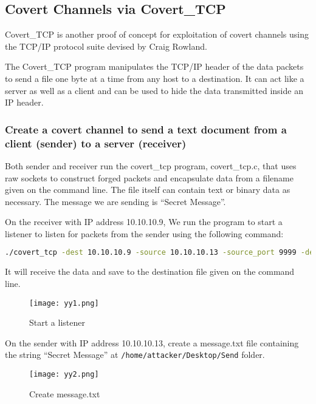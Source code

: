 \documentclass[letterpaper,twocolumn,10pt]{article}
\begin{document}
\subsection{Covert Channels via Covert\_TCP}

Covert\_TCP is another proof of concept for exploitation of covert channels using the TCP/IP protocol suite devised by Craig Rowland\cite{monday}. 

The Covert\_TCP program manipulates the TCP/IP header of the data packets to send a file one byte at a time from any host to a destination. It can act like a server as well as a client and can be used to hide the data transmitted inside an IP header.

\subsubsection{Create a covert channel to send a text document from a client (sender) to a server (receiver)}

Both sender and receiver run the covert\_tcp program, covert\_tcp.c, that uses raw sockets to construct forged packets and encapsulate data from a filename given on the command line. The file itself can contain text or binary data as necessary. The message we are sending is “Secret Message”.

On the receiver with IP address 10.10.10.9, We run the program to start a listener to listen for packets from the sender using the following command:

\begin{lstlisting}[language=bash, frame=none]
./covert_tcp -dest 10.10.10.9 -source 10.10.10.13 -source_port 9999 -dest_port 8888 -server -file /home/ubuntu/Desktop/Receive/receive.txt
\end{lstlisting}

It will receive the data and save to the destination file given on the command line. 

\begin{figure}[H]
    \centering
    \texttt{[image: yy1.png]}
    \caption{Start a listener}
\end{figure}

On the sender with IP address 10.10.10.13, create a message.txt file containing the string “Secret Message” at \lstinline{/home/attacker/Desktop/Send} folder.

\begin{figure}[H]
    \centering
    \texttt{[image: yy2.png]}
    \caption{Create message.txt}
\end{figure}
\end{document}
